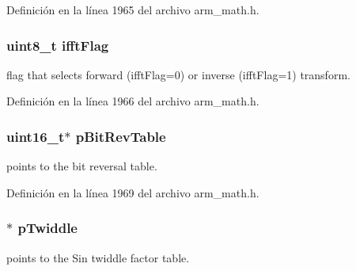 Definición en la línea 1965 del archivo arm\+\_\+math.\+h.

\subsubsection[{\texorpdfstring{ifft\+Flag}{ifftFlag}}]{\setlength{\rightskip}{0pt plus 5cm}uint8\+\_\+t ifft\+Flag}\hypertarget{structarm__cfft__radix2__instance__q15_ad6ca6e223f986ebfd94c5ee1e410aa73}{}\label{structarm__cfft__radix2__instance__q15_ad6ca6e223f986ebfd94c5ee1e410aa73}
flag that selects forward (ifft\+Flag=0) or inverse (ifft\+Flag=1) transform. 

Definición en la línea 1966 del archivo arm\+\_\+math.\+h.

\subsubsection[{\texorpdfstring{p\+Bit\+Rev\+Table}{pBitRevTable}}]{\setlength{\rightskip}{0pt plus 5cm}uint16\+\_\+t$\ast$ p\+Bit\+Rev\+Table}\hypertarget{structarm__cfft__radix2__instance__q15_a46a2fb328199897af100fea0bfdf59aa}{}\label{structarm__cfft__radix2__instance__q15_a46a2fb328199897af100fea0bfdf59aa}
points to the bit reversal table. 

Definición en la línea 1969 del archivo arm\+\_\+math.\+h.

\subsubsection[{\texorpdfstring{p\+Twiddle}{pTwiddle}}]{$\ast$ p\+Twiddle}\hypertarget{structarm__cfft__radix2__instance__q15_aa8c837c05b2c910342ab8f171d30dc02}{}\label{structarm__cfft__radix2__instance__q15_aa8c837c05b2c910342ab8f171d30dc02}
points to the Sin twiddle factor table. 

